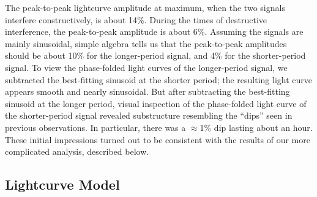 \documentclass[12pt,twocolumn,tighten]{aastex62}
\begin{document}

The peak-to-peak lightcurve amplitude at maximum, when the two signals
interfere constructively, is about 14\%.  During the times of destructive interference, the peak-to-peak
amplitude is about 6\%.  Assuming the signals are mainly sinusoidal,
simple algebra tells us that the peak-to-peak amplitudes should be
about 10\% for the longer-period signal, and 4\% for the shorter-period signal.
To view the phase-folded light curves of the longer-period signal,
we subtracted the best-fitting sinusoid at the shorter period; the resulting
light curve appears smooth and nearly sinusoidal.
But after subtracting the best-fitting sinusoid at the longer period,
visual inspection of the phase-folded light curve of the shorter-period signal
revealed substructure resembling the ``dips'' seen in previous
observations. In particular, there was a $\approx$1\% dip lasting about an hour.
These initial impressions turned out to be consistent with the results of our
more complicated analysis, described below.


\subsection{Lightcurve Model}
\end{document}
